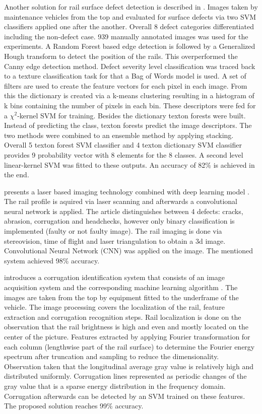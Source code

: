 \documentclass[10pt, final]{article}
\begin{document}
Another solution for rail surface defect detection is described in \cite{ma_texture_2016}.
Images taken by maintenance vehicles from the top and evaluated for surface defects via two SVM classifiers
applied one after the another.
Overall 8 defect categories differentiated including the non-defect case.
939 manually annotated images was used for the experiments.
A Random Forest based edge detection is followed by a Generalized Hough transform to detect the position of the rails.
This overperformed the Canny edge detection method.
Defect severity level classification was traced back to a texture classification task for that a Bag of Words model
is used.
A set of filters are used to create the feature vectors for each pixel in each image.
From this the dictionary is created via a k-means clustering resulting in a histogram of k bins containing the number
of pixels in each bin.
These descriptors were fed for a $\chi^2$-kernel SVM for training.
Besides the dictionary texton forests were built.
Instead of predicting the class, texton forests predict the image descriptors.
The two methods were combined to an ensemble method by applying stacking.
Overall 5 texton forest SVM classifier and 4 texton dictionary SVM classifier provides 9 probability vector with
8 elements for the 8 classes.
A second level linear-kernel SVM was fitted to these outputs.
An accuracy of 82\% is achieved in the end.

\citeauthor*{santur_new_2017} presents a laser based imaging technology combined with deep learning model \cite{santur_new_2017}.
The rail profile is aquired via laser scanning and afterwards a convolutional neural network is applied.
The article distinguishes between 4 defects: cracks, abrasion, corrugation and headchecks,
however only binary classification is implemented (faulty or not faulty image).
The rail imaging is done via stereovision, time of flight and laser triangulation to obtain a 3d image.
Convolutional Neural Network (CNN) was applied on the image.
The mentioned system achieved 98\% accuracy.

\citeauthor*{li_cyber-enabled_2018} introduces a corrugation identification system that consists of an image
acquisition system and the corresponding machine learning algorithm \cite{li_cyber-enabled_2018}.
The images are taken from the top by equipment fitted to the underframe of the vehicle.
The image processing covers the localization of the rail, feature extraction and corrugation recognition steps.
Rail localization is done on the observation that the rail brightness is high and even and mostly located on the
center of the picture.
Features extracted by applying Fourier transformation for each column (lengthwise part of the rail surface) to
determine the Fourier energy spectrum after truncation and sampling to reduce the dimensionality.
Observation taken that the longitudinal average gray value is relatively high and distributed uniformly.
Corrugation lines represented as periodic changes of the gray value that is a sparse energy distribution
in the frequency domain.
Corrugation afterwards can be detected by an SVM trained on these features.
The proposed solution reaches 99\% accuracy.
\end{document}

